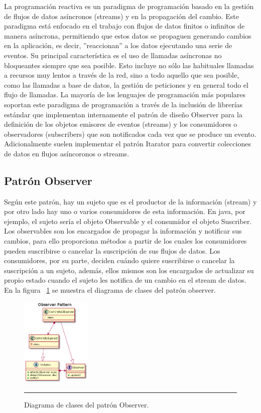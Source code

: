 La programación reactiva es un paradigma de programación basado en la gestión de flujos de datos asíncronos (streams) y en la propagación del cambio.
Este paradigma está enfocado en el trabajo con flujos de datos finitos o infinitos de manera asíncrona, permitiendo que estos datos se propaguen generando cambios en la aplicación, es decir, ''reaccionan'' a los datos ejecutando una serie de eventos.
Su principal característica es el uso de llamadas asíncronas no bloqueantes siempre que sea posible. Esto incluye no sólo las habituales llamadas a recursos muy lentos a través de la red, sino a todo aquello que sea posible, como las llamadas a base de datos, la gestión de peticiones y en general todo el flujo de llamadas.
La mayoría de los lenguajes de programación más populares soportan este paradigma de programación a través de la inclusión de librerías estándar que implementan internamente el patrón de diseño Observer para la definición de los objetos emisores de eventos (streams) y los consumidores o observadores (subscribers) que son notificados cada vez que se produce un evento.
Adicionalmente suelen implementar el patrón Itarator para convertir colecciones de datos en flujos asíncoronos o streams.
\subsection{Patrón Observer}
Según este patrón, hay un sujeto que es el productor de la información (stream) y por otro lado hay uno o varios consumidores de esta información. En java, por ejemplo, el sujeto sería el objeto Observable y el consumidor el objeto  Suscriber.
Los observables son los encargados de propagar la información y notificar sus cambios, para ello proporciona métodos a partir de los cuales los consumidores pueden suscribirse o cancelar la suscripción de sus flujos de datos.
Los consumidores, por su parte, deciden cuándo quiere suscribirse o cancelar la suscripción a un sujeto, además, ellos mismos son los encargados de actualizar su propio estado cuando el sujeto les notifica de un cambio en el stream de datos. En la figura ~\ref{fig:uml_class_observer} se muestra el diagrama de clases del patrón observer.
\begin{figure}[htbp]
	\centering
	\includegraphics[width=0.3\textwidth]{Figures/uml_class_observer.png}
	\rule{35em}{1pt}
	\caption[Observer Class Diagram]{Diagrama de clases del patrón Observer.}
	\label{fig:uml_class_observer}
\end{figure}
